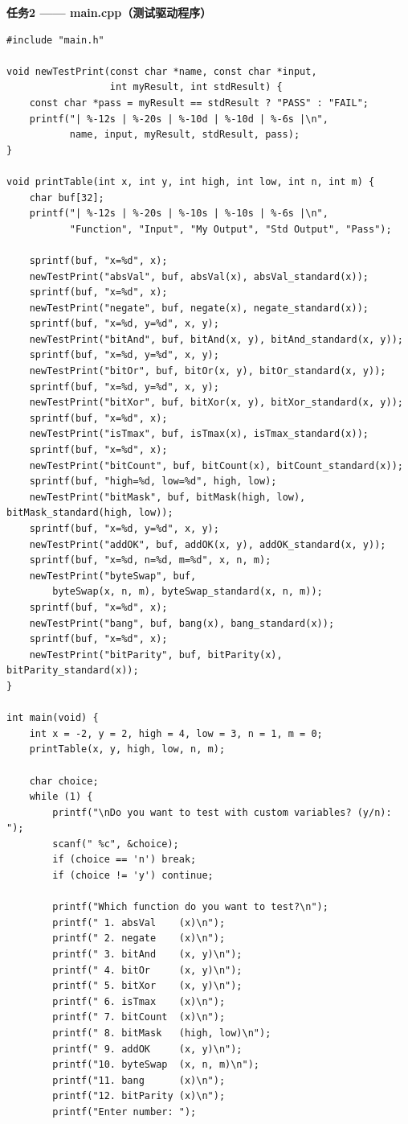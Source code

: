 \vspace{0.3cm}
\textbf{任务2 —— main.cpp（测试驱动程序）}

\begin{lstlisting}[basicstyle=\ttfamily\zihao{5},lineskip=-1pt]
#include "main.h"

void newTestPrint(const char *name, const char *input,
                  int myResult, int stdResult) {
    const char *pass = myResult == stdResult ? "PASS" : "FAIL";
    printf("| %-12s | %-20s | %-10d | %-10d | %-6s |\n",
           name, input, myResult, stdResult, pass);
}

void printTable(int x, int y, int high, int low, int n, int m) {
    char buf[32];
    printf("| %-12s | %-20s | %-10s | %-10s | %-6s |\n",
           "Function", "Input", "My Output", "Std Output", "Pass");

    sprintf(buf, "x=%d", x);
    newTestPrint("absVal", buf, absVal(x), absVal_standard(x));
    sprintf(buf, "x=%d", x);
    newTestPrint("negate", buf, negate(x), negate_standard(x));
    sprintf(buf, "x=%d, y=%d", x, y);
    newTestPrint("bitAnd", buf, bitAnd(x, y), bitAnd_standard(x, y));
    sprintf(buf, "x=%d, y=%d", x, y);
    newTestPrint("bitOr", buf, bitOr(x, y), bitOr_standard(x, y));
    sprintf(buf, "x=%d, y=%d", x, y);
    newTestPrint("bitXor", buf, bitXor(x, y), bitXor_standard(x, y));
    sprintf(buf, "x=%d", x);
    newTestPrint("isTmax", buf, isTmax(x), isTmax_standard(x));
    sprintf(buf, "x=%d", x);
    newTestPrint("bitCount", buf, bitCount(x), bitCount_standard(x));
    sprintf(buf, "high=%d, low=%d", high, low);
    newTestPrint("bitMask", buf, bitMask(high, low), bitMask_standard(high, low));
    sprintf(buf, "x=%d, y=%d", x, y);
    newTestPrint("addOK", buf, addOK(x, y), addOK_standard(x, y));
    sprintf(buf, "x=%d, n=%d, m=%d", x, n, m);
    newTestPrint("byteSwap", buf,
        byteSwap(x, n, m), byteSwap_standard(x, n, m));
    sprintf(buf, "x=%d", x);
    newTestPrint("bang", buf, bang(x), bang_standard(x));
    sprintf(buf, "x=%d", x);
    newTestPrint("bitParity", buf, bitParity(x), bitParity_standard(x));
}

int main(void) {
    int x = -2, y = 2, high = 4, low = 3, n = 1, m = 0;
    printTable(x, y, high, low, n, m);

    char choice;
    while (1) {
        printf("\nDo you want to test with custom variables? (y/n): ");
        scanf(" %c", &choice);
        if (choice == 'n') break;
        if (choice != 'y') continue;

        printf("Which function do you want to test?\n");
        printf(" 1. absVal    (x)\n");
        printf(" 2. negate    (x)\n");
        printf(" 3. bitAnd    (x, y)\n");
        printf(" 4. bitOr     (x, y)\n");
        printf(" 5. bitXor    (x, y)\n");
        printf(" 6. isTmax    (x)\n");
        printf(" 7. bitCount  (x)\n");
        printf(" 8. bitMask   (high, low)\n");
        printf(" 9. addOK     (x, y)\n");
        printf("10. byteSwap  (x, n, m)\n");
        printf("11. bang      (x)\n");
        printf("12. bitParity (x)\n");
        printf("Enter number: ");


\end{lstlisting}
